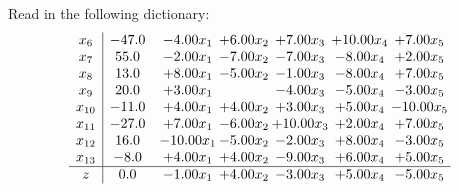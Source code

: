 \documentclass[9pt]{article}
\begin{document}
Read in the following dictionary:
\[\begin{array}{c| c c@{\hskip 2pt} c@{\hskip 2pt} c@{\hskip 2pt} c@{\hskip 2pt} c@{\hskip 2pt} }
 x_{6}   &  -47.0 & -4.00 x_{1} & +  6.00 x_{2} & +  7.00 x_{3} & + 10.00 x_{4} & +  7.00 x_{5}\\
 x_{7}   &  55.0 & -2.00 x_{1} & -7.00 x_{2} & -7.00 x_{3} & -8.00 x_{4} & +  2.00 x_{5}\\
 x_{8}   &  13.0 & +  8.00 x_{1} & -5.00 x_{2} & -1.00 x_{3} & -8.00 x_{4} & +  7.00 x_{5}\\
 x_{9}   &  20.0 & +  3.00 x_{1} &   & -4.00 x_{3} & -5.00 x_{4} & -3.00 x_{5}\\
 x_{10}   &  -11.0 & +  4.00 x_{1} & +  4.00 x_{2} & +  3.00 x_{3} & +  5.00 x_{4} & -10.00 x_{5}\\
 x_{11}   &  -27.0 & +  7.00 x_{1} & -6.00 x_{2} & + 10.00 x_{3} & +  2.00 x_{4} & +  7.00 x_{5}\\
 x_{12}   &  16.0 & -10.00 x_{1} & -5.00 x_{2} & -2.00 x_{3} & +  8.00 x_{4} & -3.00 x_{5}\\
 x_{13}   &  -8.0 & +  4.00 x_{1} & +  4.00 x_{2} & -9.00 x_{3} & +  6.00 x_{4} & +  5.00 x_{5}\\
\hline
z    &  0.0 & -1.00 x_{1} & +  4.00 x_{2} & -3.00 x_{3} & +  5.00 x_{4} & -5.00 x_{5}\\
\end{array}\]
\end{document}

